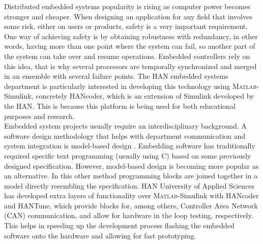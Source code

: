 \documentclass[table,xcdraw]{article}
\begin{document}
Distributed embedded systems popularity is rising as computer power becomes stronger and cheaper. When designing an application for any field that involves some risk, either on users or products, safety is a very important requirement. One way of achieving safety is by obtaining robustness with redundancy, in other words, having more than one point where the system can fail, so another part of the system can take over and resume operations. Embedded controllers rely on this idea, that is why several processors are temporally synchronized and merged in an ensemble with several failure points.
The HAN embedded systems department is particularly interested in developing this technology using \textsc{Matlab}-Simulink, concretely HANcoder, which is an extension of Simulink developed by the HAN. This is because this platform is being used for both educational purposes and research.\\

Embedded system projects usually require an interdisciplinary background. A software design methodology that helps with department communication and system integration is model-based design \citep{modeling_languages_rtes}. Embedding software has traditionally required specific text programming (usually using C) based on some previously designed specification. However, model-based design is becoming more popular as an alternative. In this other method programming blocks are joined together in a model directly resembling the specification. HAN University of Applied Sciences has developed extra layers of functionality over \textsc{Matlab}-Simulink with HANcoder and HANTune, which provide blocks for, among others, Controller Area Network (CAN) communication, and allow for hardware in the loop testing, respectively. This helps in speeding up the development process flashing the embedded software onto the hardware and allowing for fast prototyping.\\
\end{document}
